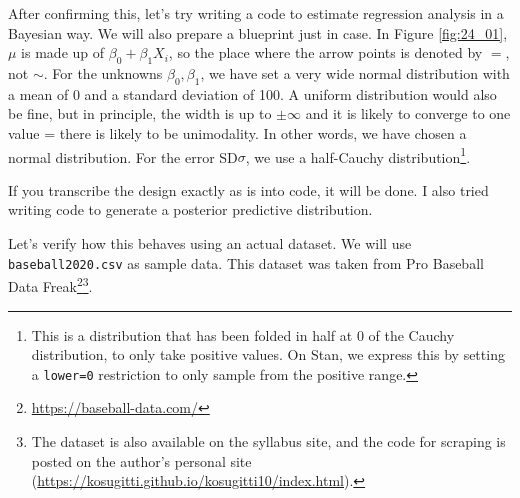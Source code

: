 \documentclass{ltjsbook}
\begin{document}
After confirming this, let's try writing a code to estimate regression analysis in a Bayesian way. We will also prepare a blueprint just in case.
In Figure \ref{fig:24_01}, $\mu$ is made up of $\beta_0+\beta_1 X_i$, so the place where the arrow points is denoted by $=$, not $\sim$. For the unknowns $\beta_0,\beta_1$, we have set a very wide normal distribution with a mean of 0 and a standard deviation of 100. A uniform distribution would also be fine, but in principle, the width is up to $\pm \infty$ and it is likely to converge to one value = there is likely to be unimodality. In other words, we have chosen a normal distribution. For the error SD$\sigma$, we use a half-Cauchy distribution\footnote{This is a distribution that has been folded in half at 0 of the Cauchy distribution, to only take positive values. On Stan, we express this by setting a \verb|lower=0| restriction to only sample from the positive range.}.

If you transcribe the design exactly as is into code, it will be done. I also tried writing code to generate a posterior predictive distribution.


Let's verify how this behaves using an actual dataset.
We will use \texttt{baseball2020.csv} as sample data. This dataset was taken from Pro Baseball Data Freak\footnote{\url{https://baseball-data.com/}}\footnote{The dataset is also available on the syllabus site, and the code for scraping is posted on the author's personal site (\url{https://kosugitti.github.io/kosugitti10/index.html}).}.
\end{document}
